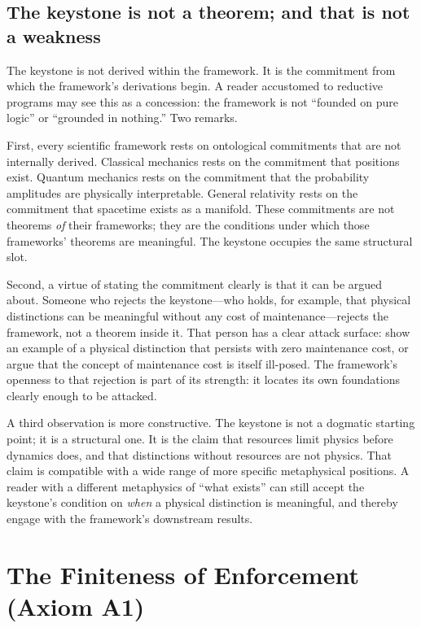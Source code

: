 \documentclass[11pt]{article}
\begin{document}
\subsection{The keystone is not a theorem; and that is not a weakness}\label{sec:keystone_not_theorem}

The keystone is not derived within the framework. It is the commitment from which the framework's derivations begin. A reader accustomed to reductive programs may see this as a concession: the framework is not ``founded on pure logic'' or ``grounded in nothing.'' Two remarks.

First, every scientific framework rests on ontological commitments that are not internally derived. Classical mechanics rests on the commitment that positions exist. Quantum mechanics rests on the commitment that the probability amplitudes are physically interpretable. General relativity rests on the commitment that spacetime exists as a manifold. These commitments are not theorems \emph{of} their frameworks; they are the conditions under which those frameworks' theorems are meaningful. The keystone occupies the same structural slot.

Second, a virtue of stating the commitment clearly is that it can be argued about. Someone who rejects the keystone---who holds, for example, that physical distinctions can be meaningful without any cost of maintenance---rejects the framework, not a theorem inside it. That person has a clear attack surface: show an example of a physical distinction that persists with zero maintenance cost, or argue that the concept of maintenance cost is itself ill-posed. The framework's openness to that rejection is part of its strength: it locates its own foundations clearly enough to be attacked.

A third observation is more constructive. The keystone is not a dogmatic starting point; it is a structural one. It is the claim that resources limit physics before dynamics does, and that distinctions without resources are not physics. That claim is compatible with a wide range of more specific metaphysical positions. A reader with a different metaphysics of ``what exists'' can still accept the keystone's condition on \emph{when} a physical distinction is meaningful, and thereby engage with the framework's downstream results.

\clearpage

\section{The Finiteness of Enforcement (Axiom A1)}\label{sec:A1}
\end{document}
